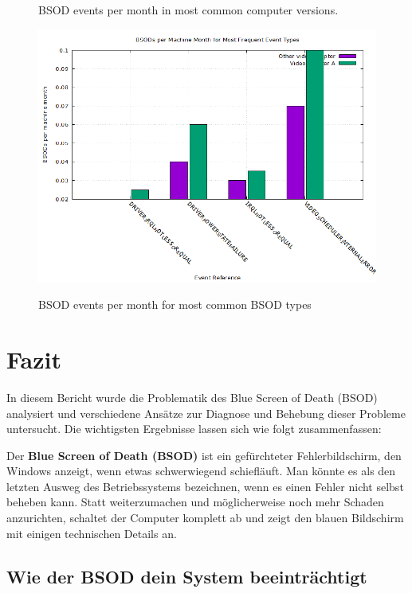 \documentclass[paper=a4,fontsize=12pt,ngerman,parskip=half]{scrartcl}
\begin{document}
\begin{figure}[!ht]
\begin{minipage}[b]{0.4\textwidth}
    \caption{BSOD events per month in most common computer versions.}\cite{mosaic2017}
    \label{fig:Plot2}
  \end{minipage}
  \vfill
  \begin{minipage}[b]{0.4\textwidth}
    \centering
    \includegraphics[width=\textwidth]{graphics/Charts/New_Charts/plot3.png}
    \caption{ BSOD events per month for most common BSOD types}\cite{mosaic2017}
    \label{fig:Plot3}
  \end{minipage}
  \label{fig:Plots}
\end{figure}
\pagebreak
\section{Fazit}

In diesem Bericht wurde die Problematik des Blue Screen of Death (BSOD) analysiert und verschiedene Ansätze zur Diagnose und Behebung dieser Probleme untersucht. Die wichtigsten Ergebnisse lassen sich wie folgt zusammenfassen:

Der \textbf{Blue Screen of Death (BSOD)} ist ein gefürchteter Fehlerbildschirm, den Windows anzeigt, wenn etwas schwerwiegend schiefläuft. Man könnte es als den letzten Ausweg des Betriebssystems bezeichnen, wenn es einen Fehler nicht selbst beheben kann. Statt weiterzumachen und möglicherweise noch mehr Schaden anzurichten, schaltet der Computer komplett ab und zeigt den blauen Bildschirm mit einigen technischen Details an.\cite{WindowsInternalsPart1}

\subsection*{Wie der BSOD dein System beeinträchtigt}
\end{document}
